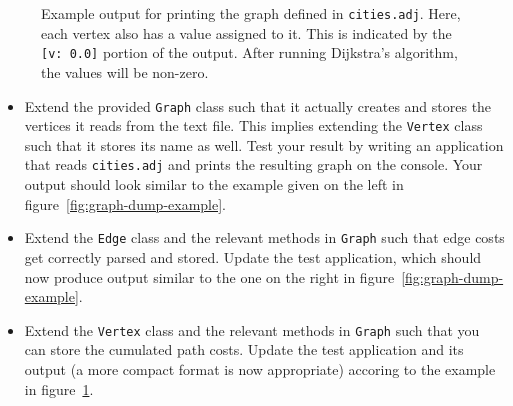 \documentclass[a4paper,10pt]{article}
\begin{document}
\begin{figure}
  \centering
  \fbox{
    \begin{minipage}{\columnwidth}
      \footnotesize
      
  \end{minipage}}
  \caption{
    Example output for printing the graph defined in \texttt{cities.adj}.
    Here, each vertex also has a value assigned to it.
    This is indicated by the \texttt{[v: 0.0]} portion of the output.
    After running Dijkstra's algorithm, the values will be non-zero.
  }\label{fig:graph-dump-example-vc}
\end{figure}

\begin{itemize}

\item
  Extend the provided \texttt{Graph} class such that it actually creates and stores the vertices it reads from the text file.
  This implies extending the \texttt{Vertex} class such that it stores its name as well.
  Test your result by writing an application that reads \texttt{cities.adj} and prints the resulting graph on the console.
  Your output should look similar to the example given on the left in figure~\ref{fig:graph-dump-example}.
  
\item
  Extend the \texttt{Edge} class and the relevant methods in \texttt{Graph} such that edge costs get correctly parsed and stored.
  Update the test application, which should now produce output similar to the one on the right in figure~\ref{fig:graph-dump-example}.

\item
  Extend the \texttt{Vertex} class and the relevant methods in \texttt{Graph} such that you can store the cumulated path costs.
  Update the test application and its output (a more compact format is now appropriate) accoring to the example in figure~\ref{fig:graph-dump-example-vc}.


\end{itemize}
\end{document}
